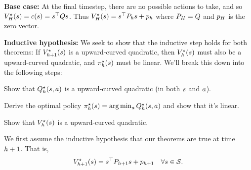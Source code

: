 \documentclass[\main/main]{subfiles}
\begin{document}



\textbf{Base case:} At the final timestep, there are no possible actions to take, and so $V^\star_H(s) = c(s) = s^\top Q s$. Thus $V_H^\star(s) = s^\top P_h s + p_h$ where $P_H = Q$ and $p_H$ is the zero vector.

\textbf{Inductive hypothesis:} We seek to show that the inductive step holds for both theorems: If $V^\star_{h+1}(s)$ is a upward-curved quadratic, then $V^\star_h(s)$ must also be a upward-curved quadratic, and $\pi^\star_h(s)$ must be linear. We'll break this down into the following steps:
\begin{steps}
    \item Show that $Q^\star_h(s, a)$ is a upward-curved quadratic (in both $s$ and $a$).
    \item Derive the optimal policy $\pi^\star_h(s) = \arg \min_a Q^\star_h(s, a)$ and show that it's linear.
    \item Show that $V^\star_h(s)$ is a upward-curved quadratic.
\end{steps}

We first assume the inductive hypothesis that our theorems are true at time $h+1$. That is,
\[ V^\star_{h+1}(s) = s^\top P_{h+1} s + p_{h+1} \quad \forall s \in \mathcal{S}. \]
\end{document}
